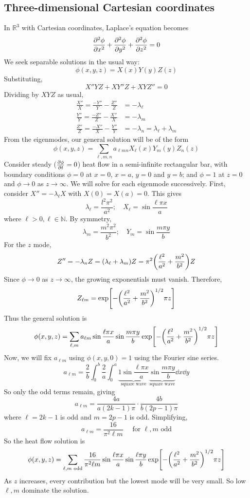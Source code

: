 \subsection{Three-dimensional Cartesian coordinates}
In \( \mathbb R^3 \) with Cartesian coordinates, Laplace's equation becomes
\[
	\pdv[2]{\phi}{x} + \pdv[2]{\phi}{y} + \pdv[2]{\phi}{z} = 0
\]
We seek separable solutions in the usual way:
\[
	\phi(x,y,z) = X(x)Y(y)Z(z)
\]
Substituting,
\[
	X''YZ + XY''Z + XYZ'' = 0
\]
Dividing by \( XYZ \) as usual,
\begin{align*}
	\frac{X''}{X} = \frac{-Y''}{Y} - \frac{Z''}{Z} & = -\lambda_\ell                         \\
	\frac{Y''}{Y} = \frac{-Z''}{Z} - \frac{X''}{X} & = -\lambda_m                            \\
	\frac{Z''}{Z} = \frac{-X''}{X} - \frac{Y''}{Y} & = -\lambda_n = \lambda_\ell + \lambda_m
\end{align*}
From the eigenmodes, our general solution will be of the form
\[
	\phi(x,y,z) = \sum_{\ell,m,n} a_{\ell mn} X_\ell(x) Y_m(y) Z_n(z)
\]
Consider steady (\(\pdv{\phi}{t} = 0 \)) heat flow in a semi-infinite rectangular bar, with boundary conditions \( \phi = 0 \) at \( x = 0 \), \( x = a \), \( y = 0 \) and \( y = b \); and \( \phi = 1 \) at \( z = 0 \) and \( \phi \to 0 \) as \( z \to \infty \).
We will solve for each eigenmode successively.
First, consider \( X'' = -\lambda_\ell X \) with \( X(0) = X(a) = 0 \).
This gives
\[
	\lambda_\ell = \frac{l^2 \pi^2}{a^2};\quad X_\ell = \sin \frac{\ell \pi x}{a}
\]
where \( \ell > 0, \ell \in \mathbb N \).
By symmetry,
\[
	\lambda_m = \frac{m^2 \pi^2}{b^2};\quad Y_m = \sin \frac{m \pi y}{b}
\]
For the \( z \) mode,
\[
	Z'' = -\lambda_n Z = (\lambda_\ell + \lambda_m) Z = \pi^2\qty(\frac{\ell^2}{a^2} + \frac{m^2}{b^2}) Z
\]
Since \( \phi \to 0 \) as \( z \to \infty \), the growing exponentials must vanish.
Therefore,
\[
	Z_{\ell m} = \exp[-\qty(\frac{\ell^2}{a^2} + \frac{m^2}{b^2})^{1/2} \pi z]
\]
Thus the general solution is
\[
	\phi(x,y,z) = \sum_{\ell, m} a_{\ell m} \sin \frac{\ell \pi x}{a} \sin \frac{m \pi y}{b} \exp[-\qty(\frac{\ell^2}{a^2} + \frac{m^2}{b^2})^{1/2} \pi z]
\]
Now, we will fix \( a_{\ell m} \) using \( \phi(x,y,0) = 1 \) using the Fourier sine series.
\[
	a_{\ell m} = \frac{2}{b} \int_0^b \frac{2}{a} \int_0^a \underbrace{1 \sin \frac{\ell \pi x}{a}}_{\text{square wave}} \underbrace{\sin \frac{m \pi y}{b}}_{\text{square wave}} \dd{x} \dd{y}
\]
So only the odd terms remain, giving
\[
	a_{\ell m} = \frac{4a}{a(2k-1)\pi} \cdot \frac{4b}{b(2p-1) \pi}
\]
where \( \ell = 2k-1 \) is odd and \( m = 2p-1 \) is odd.
Simplifying,
\[
	a_{\ell m} = \frac{16}{\pi^2 \ell m} \quad \text{ for } \ell, m \text{ odd}
\]
So the heat flow solution is
\[
	\phi(x,y,z) = \sum_{\ell, m \text{ odd}} \frac{16}{\pi^2 \ell m} \sin \frac{\ell \pi x}{a} \sin \frac{\ell \pi y}{b} \exp[-\qty(\frac{\ell^2}{a^2} + \frac{m^2}{b^2})^{1/2} \pi z]
\]
As \( z \) increases, every contribution but the lowest mode will be very small.
So low \( \ell, m \) dominate the solution.

